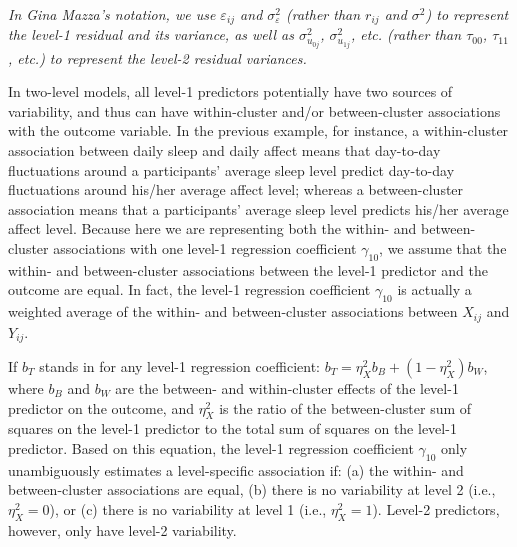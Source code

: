 \emph{In Gina Mazza's notation, we use $\varepsilon_{ij}$ and $\sigma_{\varepsilon}^2$ (rather than $r_{ij}$ and $\sigma^2$) to represent the level-1 residual and its variance, as well as $\sigma_{u_{0j}}^2$, $\sigma_{u_{1j}}^2$, etc. (rather than $\tau_{00}$, $\tau_{11}$, etc.) to represent the level-2 residual variances.}

In two-level models, all level-1 predictors potentially have two sources of variability, and thus can have within-cluster and/or between-cluster associations with the outcome variable. In the previous example, for instance, a within-cluster association between daily sleep and daily affect means that day-to-day fluctuations around a participants' average sleep level predict day-to-day fluctuations around his/her average affect level; whereas a between-cluster association means that a participants' average sleep level predicts his/her average affect level. Because here we are representing both the within- and between-cluster associations with one level-1 regression coefficient $\gamma_{10}$, we assume that the within- and between-cluster associations between the level-1 predictor and the outcome are equal. In fact, the level-1 regression coefficient $\gamma_{10}$ is actually a weighted average of the within- and between-cluster associations between $X_{ij}$ and $Y_{ij}$. 

If $b_T$ stands in for any level-1 regression coefficient: $b_T = \eta_X^2 b_B + (1 - \eta_X^2)b_W$, where $b_B$ and $b_W$ are the between- and within-cluster effects of the level-1 predictor on the outcome, and $\eta_X^2$ is the ratio of the between-cluster sum of squares on the level-1 predictor to the total sum of squares on the level-1 predictor. Based on this equation, the level-1 regression coefficient $\gamma_{10}$ only unambiguously estimates a level-specific association if: (a) the within- and between-cluster associations are equal, (b) there is no variability at level 2 (i.e., $\eta_X^2 = 0$), or (c) there is no variability at level 1 (i.e., $\eta_X^2 = 1$). Level-2 predictors, however, only have level-2 variability. 

